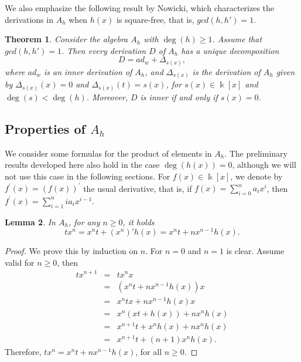 \documentclass{article}
\numberwithin{equation}{section}\theoremstyle{plain}
\newtheorem{theorem}{Theorem}
\newtheorem{lemma}[theorem]{Lemma}
\begin{document}
We also emphasize the following result by Nowicki, which characterizes the derivations in $A_h$ when $h(x)$ is square-free, that is, $gcd(h,h')=1$.

\begin{theorem}\label{nowicki_mdc1}\cite[Thm. 10.1]{Nowicki}
Consider the algebra $A_h$ with $\deg(h)\geq 1$. Assume that $gcd(h,h')=1$. Then every derivation $D$ of $A_h$ has a unique decomposition
\begin{equation}\label{eq_Dmdc1}
    D=ad_w+\Delta_{s(x)},
\end{equation}
where $ad_w$ is an inner derivation of $A_h$, and  $\Delta_{s(x)}$ is the derivation of $A_h$ given by $\Delta_{s(x)} (x)=0$ and $\Delta_{s(x)} (t)=s(x)$, for $s(x)\in \Bbbk[x]$ and $\deg(s)<\deg(h)$.
Moreover, $D$ is inner if and only if $s(x)=0$.
\end{theorem}

\subsection{Properties of $A_h$}

We consider some formulas for the product of elements in $A_h$.
The preliminary results developed here also hold in the case $\deg(h(x))=0$, although we will not use this case in the following sections.
For $f(x) \in \Bbbk [x]$, we denote by $f^\prime(x)=\left(f(x)\right)^\prime$ the usual derivative, that is, if $f(x)=\sum_{i=0}^n a_i x^i$, then $f^\prime(x) = \sum_{i=1}^n i a_i x^{i-1}$.

\begin{lemma}\label{lematx^n} In $A_h$, for any $n \geq 0$, it holds
\begin{equation}\label{lematx^n_eq}
tx^n=x^nt+(x^n)'h(x)=x^nt+nx^{n-1} h(x).
\end{equation}

\end{lemma}
\begin{proof}
    We prove this by induction on $n$.
    For $n=0$ and $n=1$ is clear.
    Assume valid for $n\geq 0$, then
    \begin{eqnarray*}
    tx^{n+1}&=& tx^nx\\
    &=& (x^nt+nx^{n-1} h(x))x\\
    &=& x^ntx+nx^{n-1} h(x)x\\
    &=& x^n(xt+h(x)) + nx^nh(x)\\
    &=& x^{n+1}t + x^nh(x) + nx^nh(x)\\
    &=& x^{n+1}t + (n+1)x^{n}h(x).
       \end{eqnarray*}
       Therefore,  $tx^n=x^nt+nx^{n-1} h(x)$, for all $n\geq 0$.
\end{proof}
\end{document}
